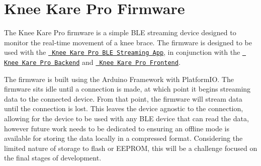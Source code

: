 \chapter{Knee Kare Pro Firmware}
\hypertarget{md__r_e_a_d_m_e}{}\label{md__r_e_a_d_m_e}
\label{md__r_e_a_d_m_e_autotoc_md0}%
%


The Knee Kare Pro firmware is a simple BLE streaming device designed to monitor the real-\/time movement of a knee brace. The firmware is designed to be used with the \href{https://github.com/KneeKarePro/bt_test}{\texttt{ Knee Kare Pro BLE Streaming App}}, in conjunction with the \href{https://github.com/KneeKarePro/FlaskBackend}{\texttt{ Knee Kare Pro Backend}} and \href{https://github.com/KneeKarePro/WebApp}{\texttt{ Knee Kare Pro Frontend}}.

The firmware is built using the Arduino Framework with Platform\+IO. The firmware sits idle until a connection is made, at which point it begins streaming data to the connected device. From that point, the firmware will stream data until the connection is lost. This leaves the device agnostic to the connection, allowing for the device to be used with any BLE device that can read the data, however future work needs to be dedicated to ensuring an offline mode is available for storing the data locally in a compressed format. Considering the limited nature of storage to flash or EEPROM, this will be a challenge focused on the final stages of development. 